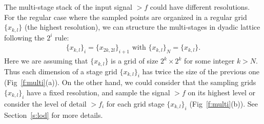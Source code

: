 The multi-stage stack of the input signal $\gt{f}$ could have different resolutions.
For the regular case where the sampled points are organized in a regular grid $\{x_{k,l}\}$ (the highest resolution), we can structure the multi-stages in dyadic lattice following the $2^i$ rule: 
\begin{align*}
\{x_{k,l}\}_i=\{x_{2k,2l}\}_{i+1}\text{ with }\{x_{k,l}\}_N=\{x_{k,l}\}.
\end{align*}
Here we are assuming that $\{x_{k,l}\}$ is a grid of size $2^k\times 2^k$ for some integer $k>N$.
Thus each dimension of a stage grid $\{x_{k,l}\}_i$ has twice the size of the previous one (Fig~\ref{f:multi}(a)). 
On the other hand, we could consider that the sampling grids $\{x_{k,l}\}_i$ have a fixed resolution, and sample the signal $\gt{f}$ on its highest level or consider the level of detail $\gt{f}_i$ for each grid stage $\{x_{k,l}\}_i$ (Fig~\ref{f:multi}(b)). See Section~\ref{s:lod} for more details.
